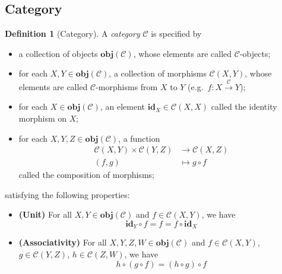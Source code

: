 \documentclass[12pt,a4paper]{report}
\theoremstyle{definition}
\newtheorem{definition}{Definition}[chapter]
\begin{document}
        \subsection{Category}
        \begin{definition}[Category] \label{def: category}
            A \emph{category} $\mathcal{C}$ is specified by
            \begin{itemize}
                \item 
                    a collection of objects $\textbf{obj}(\mathcal{C})$, whose elements are called $\mathcal{C}$-objects;
                \item 
                    for each $X, Y \in \textbf{obj}(\mathcal{C})$, a collection of morphisms $\mathcal{C}{(X,Y)}$, whose elements are called $\mathcal{C}$-morphisms from $X$ to $Y$ (e.g.\ $f : X \xrightarrow{\mathcal{C}} Y$);
                \item 
                    for each $X \in \textbf{obj}(\mathcal{C})$, an element $\textbf{id}_X \in \mathcal{C}{(X,X)}$ called the identity morphism on $X$;
                \item 
                    for each $X, Y, Z \in \textbf{obj}(\mathcal{C})$, a function 
                    \[\begin{aligned}
                        \mathcal{C}{(X,Y)} \times \mathcal{C}{(Y,Z)} &\to \mathcal{C}{(X,Z)} \\
                        (f,g) &\mapsto g \circ f
                    \end{aligned}\]
                    called the composition of morphisms;
            \end{itemize}
            satisfying the following properties:
            \begin{itemize}
                \item 
                    \textbf{(Unit)}
                    For all $X, Y \in \textbf{obj}(\mathcal{C})$ and $f \in \mathcal{C}{(X,Y)}$, we have
                    \begin{equation} \label{law: unit}
                        \textbf{id}_Y \circ f = f = f \circ \textbf{id}_X
                    \end{equation}
                \item
                    \textbf{(Associativity)}
                    For all $X, Y, Z, W \in \textbf{obj}(\mathcal{C})$ and $f \in \mathcal{C}{(X,Y)}$, $g \in \mathcal{C}{(Y,Z)}$, $h \in \mathcal{C}{(Z,W)}$, we have
                    \begin{equation} \label{law: associativity}
                        h \circ (g \circ f) = (h \circ g) \circ f
                    \end{equation}
            \end{itemize}
        \end{definition}
\end{document}
